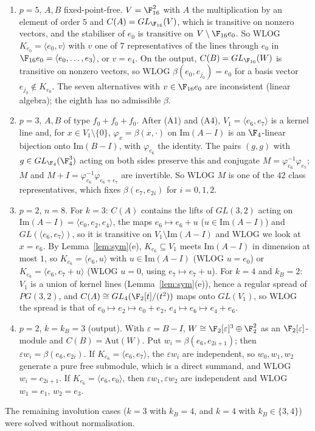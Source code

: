 \begin{enumerate}
$\beta(e_0,e_1)=0$; then $C(I)=GL(W)$ maps $\beta(e_0,e_j)$ ($2\le j\le7$) to $e_{j-2}$.
\item[(A6)] $p=5$, $A,B$ fixed-point-free. $V=\F_{16}^2$ with $A$ the multiplication by an
element of order $5$ and $C(A)=GL_{\F_{16}}(V)$, which is transitive on nonzero vectors, and the
stabiliser of $e_0$ is transitive on $V\setminus\F_{16}e_0$. So WLOG $K_{e_0}=\langle e_0,v\rangle$
with $v$ one of $7$ representatives of the lines through $e_0$ in $\F_{16}e_0=\langle
e_0,\dots,e_3\rangle$, or $v=e_4$. On the output, $C(B)=GL_{\F_{16}}(W)$ is transitive on nonzero
vectors, so WLOG $\beta(e_0,e_{j_0})=e_0$ for a basis vector $e_{j_0}\notin K_{e_0}$. The seven
alternatives with $v\in\F_{16}e_0$ are inconsistent (linear algebra); the eighth has no
admissible $\beta$.
\item[(A7)] $p=3$, $A,B$ of type $f_0+f_0+f_0$. After (A1) and (A4), $V_1=\langle e_6,e_7\rangle$
is a kernel line and, for $x\in V_1\setminus\{0\}$, $\varphi_x=\beta(x,\cdot)$ on
$\mathrm{Im}(A-I)$ is an $\F_4$-linear bijection onto $\mathrm{Im}(B-I)$, with $\varphi_{e_6}$ the
identity. The pairs $(g,g)$ with $g\in GL_{\F_4}(\F_4^3)$ acting on both sides preserve this and
conjugate $M=\varphi_{e_6}^{-1}\varphi_{e_7}$; $M$ and $M+I=\varphi_{e_6}^{-1}\varphi_{e_6+e_7}$ are
invertible. So WLOG $M$ is one of the $42$ class representatives, which fixes
$\beta(e_7,e_{2i})$ for $i=0,1,2$.
\item[(A8)] $p=2$, $n=8$. For $k=3$: $C(A)$ contains the lifts of $GL(3,2)$ acting on
$\mathrm{Im}(A-I)=\langle e_0,e_2,e_4\rangle$, the maps $e_6\mapsto e_6+u$
($u\in\mathrm{Im}(A-I)$) and $GL(\langle e_6,e_7\rangle)$, so it is transitive on
$V_1\setminus\mathrm{Im}(A-I)$ and WLOG we look at $x=e_6$. By Lemma~\ref{lem:sym}(e),
$K_{e_6}\subseteq V_1$ meets $\mathrm{Im}(A-I)$ in dimension at most $1$, so
$K_{e_6}=\langle e_6,u\rangle$ with $u\in\mathrm{Im}(A-I)$ (WLOG $u=e_0$) or
$K_{e_6}=\langle e_6,e_7+u\rangle$ (WLOG $u=0$, using $e_7\mapsto e_7+u$). For $k=4$ and $k_B=2$:
$V_1$ is a union of kernel lines (Lemma~\ref{lem:sym}(e)), hence a regular spread of $PG(3,2)$,
and $C(A)\cong GL_4(\F_2[t]/(t^2))$ maps onto $GL(V_1)$, so WLOG the spread is that of
$e_0\mapsto e_2\mapsto e_0+e_2$, $e_4\mapsto e_6\mapsto e_4+e_6$.
\item[(A9)] $p=2$, $k=k_B=3$ (output). With $\varepsilon=B-I$, $W\cong\F_2[\varepsilon]^3\oplus
\F_2^2$ as an $\F_2[\varepsilon]$-module and $C(B)=\mathrm{Aut}(W)$. Put
$w_i=\beta(e_6,e_{2i+1})$; then $\varepsilon w_i=\beta(e_6,e_{2i})$. If
$K_{e_6}=\langle e_6,e_7\rangle$, the $\varepsilon w_i$ are independent, so $w_0,w_1,w_2$ generate a
pure free submodule, which is a direct summand, and WLOG $w_i=e_{2i+1}$. If
$K_{e_6}=\langle e_6,e_0\rangle$, then $\varepsilon w_1,\varepsilon w_2$ are independent and WLOG
$w_1=e_1$, $w_2=e_3$.
\end{enumerate}
The remaining involution cases ($k=3$ with $k_B=4$, and $k=4$ with $k_B\in\{3,4\}$) were solved
without normalisation.

